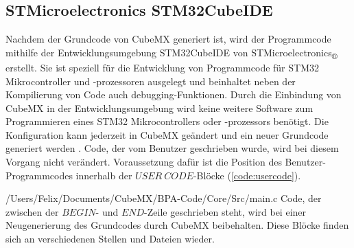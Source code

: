 
\subsection{STMicroelectronics STM32CubeIDE}
Nachdem der Grundcode von CubeMX generiert ist, wird der Programmcode mithilfe der Entwicklungsumgebung STM32CubeIDE von STMicroelectronics\textsubscript{®} erstellt. Sie ist speziell für die Entwicklung von Programmcode für STM32 Mikrocontroller und -prozessoren ausgelegt und beinhaltet neben der Kompilierung von Code auch debugging-Funktionen. Durch die Einbindung von CubeMX in der Entwicklungsumgebung wird keine weitere Software zum Programmieren eines STM32 Mikrocontrollers oder -prozessors benötigt. Die Konfiguration kann jederzeit in CubeMX geändert und ein neuer Grundcode generiert werden \cite{CubeIDE}. Code, der vom Benutzer geschrieben wurde, wird bei diesem Vorgang nicht verändert. Voraussetzung dafür ist die Position des Benutzer-Programmcodes innerhalb der $USER\ CODE$-Blöcke (\ref{code:usercode}).

{/Users/Felix/Documents/CubeMX/BPA-Code/Core/Src/main.c}
Code, der zwischen der $BEGIN$- und $END$-Zeile geschrieben steht, wird bei einer Neugenerierung des Grundcodes durch CubeMX beibehalten. Diese Blöcke finden sich an verschiedenen Stellen und Dateien wieder.\\

